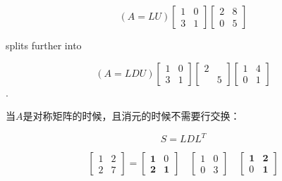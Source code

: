 \begin{example}
    
    \begin{equation}(A= LU) \left[\begin{array}{ll}1 & 0 \\ 3 & 1\end{array}\right]\left[\begin{array}{ll}2 & 8 \\ 0 & 5\end{array}\right] \end{equation} 
    
    splits further into
    
    \begin{equation}(A= LDU) \left[\begin{array}{ll}1 & 0 \\ 3 & 1\end{array}\right]\left[\begin{array}{ll}2 & \\ & 5\end{array}\right]\left[\begin{array}{ll}1 & 4 \\ 0 & 1\end{array}\right] \end{equation}.
    
\end{example}

\begin{theorem}
    当$A$是对称矩阵的时候，且消元的时候不需要行交换：

    \begin{equation}S = LDL^T\end{equation}
\end{theorem}


\begin{example}
    \begin{equation} \left[\begin{array}{ll}1 & 2 \\ 2 & 7\end{array}\right]=\left[\begin{array}{ll}\mathbf{1} & 0 \\ \mathbf{2} & \mathbf{1}\end{array}\right] \quad\left[\begin{array}{ll}1 & 0 \\ 0 & 3\end{array}\right] \quad\left[\begin{array}{ll}\mathbf{1} & \mathbf{2} \\ 0 & \mathbf{1}\end{array}\right] \end{equation}
\end{example}


